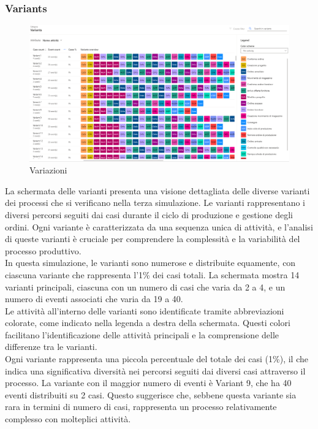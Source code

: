 \documentclass{article}
\begin{document}
\subsubsection{Variants}
\begin{figure}[H]
    \centering
    \includegraphics[width=\textwidth]{imgMicrosoft/TerzaSimulazione/VariantsSimulazione3.png}
    \caption{Variazioni}
    \label{fig:variants}
\end{figure}
La schermata delle varianti presenta una visione dettagliata delle diverse varianti dei processi che si verificano nella terza simulazione. Le varianti rappresentano i diversi percorsi seguiti dai casi durante il ciclo di produzione e gestione degli ordini. Ogni variante è caratterizzata da una sequenza unica di attività, e l'analisi di queste varianti è cruciale per comprendere la complessità e la variabilità del processo produttivo.\\
In questa simulazione, le varianti sono numerose e distribuite equamente, con ciascuna variante che rappresenta l'1\% dei casi totali. La schermata mostra 14 varianti principali, ciascuna con un numero di casi che varia da 2 a 4, e un numero di eventi associati che varia da 19 a 40.\\
Le attività all'interno delle varianti sono identificate tramite abbreviazioni colorate, come indicato nella legenda a destra della schermata. Questi colori facilitano l'identificazione delle attività principali e la comprensione delle differenze tra le varianti.\\
Ogni variante rappresenta una piccola percentuale del totale dei casi (1\%), il che indica una significativa diversità nei percorsi seguiti dai diversi casi attraverso il processo. La variante con il maggior numero di eventi è Variant 9, che ha 40 eventi distribuiti su 2 casi. Questo suggerisce che, sebbene questa variante sia rara in termini di numero di casi, rappresenta un processo relativamente complesso con molteplici attività.\\
\end{document}
